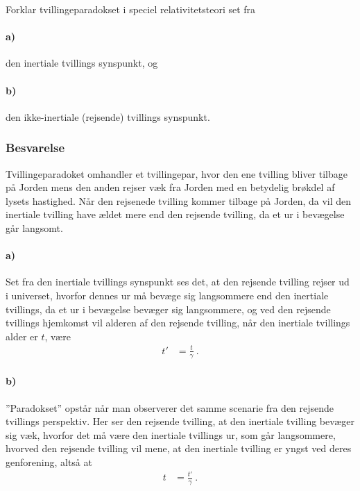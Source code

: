\documentclass[../main.tex]{subfiles}
\begin{document}
Forklar tvillingeparadokset i speciel relativitetsteori set fra
\paragraph{a)} den inertiale tvillings synspunkt, og
\paragraph{b)} den ikke-inertiale (rejsende) tvillings synspunkt.


\subsubsection{Besvarelse}

Tvillingeparadoket omhandler et tvillingepar, hvor den ene tvilling bliver tilbage på Jorden mens den anden rejser væk fra Jorden med en betydelig brøkdel af lysets hastighed. Når den rejsenede tvilling kommer tilbage på Jorden, da vil den inertiale tvilling have ældet mere end den rejsende tvilling, da et ur i bevægelse går langsomt.


\paragraph{a)}

Set fra den inertiale tvillings synspunkt ses det, at den rejsende tvilling rejser ud i universet, hvorfor dennes ur må bevæge sig langsommere end den inertiale tvillings, da et ur i bevægelse bevæger sig langsommere, og ved den rejsende tvillings hjemkomst vil alderen af den rejsende tvilling, når den inertiale tvillings alder er $t$, være
\begin{align}
    t' &= \frac{t}{\gamma} \: .
\end{align}



\paragraph{b)}

''Paradokset'' opstår når man observerer det samme scenarie fra den rejsende tvillings perspektiv. Her ser den rejsende tvilling, at den inertiale tvilling bevæger sig væk, hvorfor det må være den inertiale tvillings ur, som går langsommere, hvorved den rejsende tvilling vil mene, at den inertiale tvilling er yngst ved deres genforening, altså at
\begin{align}
    t &= \frac{t'}{\gamma} \: .
\end{align}
\end{document}
